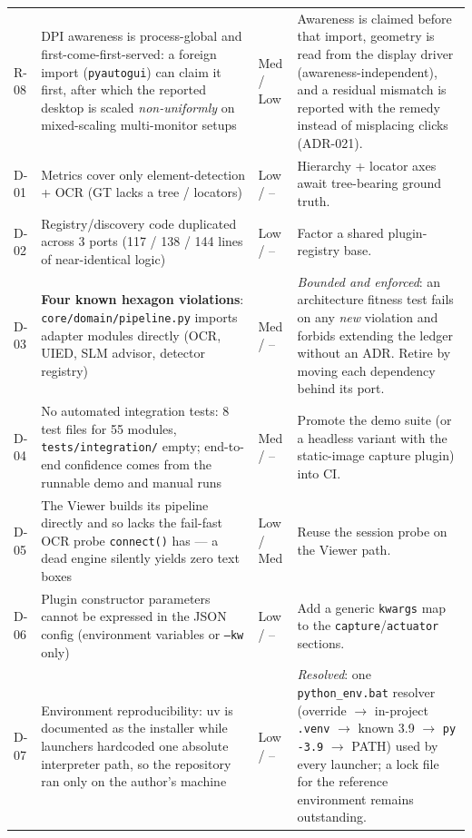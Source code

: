 \documentclass[11pt,a4paper]{report}
\newcommand{\code}[1]{\texttt{#1}}
\begin{document}
\begin{longtable}{@{}p{1.2cm}p{5.0cm}p{2.0cm}p{5.6cm}@{}}
R-08 & DPI awareness is process-global and first-come-first-served: a foreign import (\code{pyautogui}) can claim it first, after which the reported desktop is scaled \emph{non-uniformly} on mixed-scaling multi-monitor setups & Med / Low & Awareness is claimed before that import, geometry is read from the display driver (awareness-independent), and a residual mismatch is reported with the remedy instead of misplacing clicks (ADR-021). \\
D-01 & Metrics cover only element-detection + OCR (GT lacks a tree / locators) & Low / -- & Hierarchy + locator axes await tree-bearing ground truth. \\
D-02 & Registry/discovery code duplicated across 3 ports (117 / 138 / 144 lines of near-identical logic) & Low / -- & Factor a shared plugin-registry base. \\
D-03 & \textbf{Four known hexagon violations}: \code{core/domain/pipeline.py} imports adapter modules directly (OCR, UIED, SLM advisor, detector registry) & Med / -- & \emph{Bounded and enforced}: an architecture fitness test fails on any \emph{new} violation and forbids extending the ledger without an ADR. Retire by moving each dependency behind its port. \\
D-04 & No automated integration tests: 8 test files for 55 modules, \code{tests/integration/} empty; end-to-end confidence comes from the runnable demo and manual runs & Med / -- & Promote the demo suite (or a headless variant with the static-image capture plugin) into CI. \\
D-05 & The Viewer builds its pipeline directly and so lacks the fail-fast OCR probe \code{connect()} has --- a dead engine silently yields zero text boxes & Low / Med & Reuse the session probe on the Viewer path. \\
D-06 & Plugin constructor parameters cannot be expressed in the JSON config (environment variables or \code{--kw} only) & Low / -- & Add a generic \code{kwargs} map to the \code{capture}/\code{actuator} sections. \\
D-07 & Environment reproducibility: uv is documented as the installer while launchers hardcoded one absolute interpreter path, so the repository ran only on the author's machine & Low / -- & \emph{Resolved}: one \code{python\_env.bat} resolver (override $\rightarrow$ in-project \code{.venv} $\rightarrow$ known 3.9 $\rightarrow$ \code{py -3.9} $\rightarrow$ PATH) used by every launcher; a lock file for the reference environment remains outstanding. \\
\bottomrule
\end{longtable}
\end{document}
